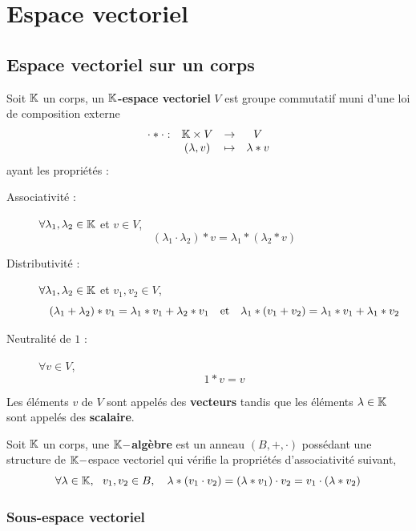 \chapter{Espace vectoriel}
\section{Espace vectoriel sur un corps}


\begin{definition} \label{def: Espace vectoriel}
Soit $\K$ un corps, un $\K$\textbf{-espace vectoriel} $V$ est groupe commutatif muni d'une loi de composition externe
	\[
	\begin{array}{cccc}
		\cdot * \cdot : & \mathbb{K} \times V & \to & V \\
						& (\lambda, v) & \mapsto & \lambda * v
	\end{array}
	\]
ayant les propriétés :
\begin{description}
	\item[Associativité :] $\forall \lambda_1, \lambda_2 \in \mathbb{K}$ et $v \in V$,
	\[
	(\lambda_1 \cdot \lambda_2) * v = \lambda_1 * (\lambda_2 * v)
	\]
	\item[Distributivité :] $\forall \lambda_1, \lambda_2 \in \mathbb{K}$ et $v_1, v_2 \in V$,
	\[
	(\lambda_1 + \lambda_2) * v_1 = \lambda_1 * v_1 + \lambda_2 * v_1 \quad \text{et} \quad \lambda_1 * (v_1 + v_2) = \lambda_1 * v_1 + \lambda_1 * v_2
	\]
	\item[Neutralité de $1$ :] $\forall v \in V$,
	\[
	1 * v = v	
	\]
\end{description}
Les éléments $v$ de $V$ sont appelés des \textbf{vecteurs} tandis que les éléments $\lambda \in \mathbb{K}$ sont appelés des \textbf{scalaire}.
\end{definition}


\begin{definition}[$\K$-algèbre] \label{def: algèbre}
Soit $\K$ un corps, une $\mathbb{K}-$\textbf{algèbre} est un anneau $(B, +, \cdot)$ possédant une structure de $\mathbb{K}-$espace vectoriel qui vérifie la propriétés d'associativité suivant,
	\[
	\forall \lambda \in \mathbb{K}, ~\ v_1, v_2 \in B, \quad \lambda * (v_1 \cdot v_2) = (\lambda * v_1) \cdot v_2 =  v_1 \cdot (\lambda * v_2)
	\]
\end{definition}


\subsection{Sous-espace vectoriel}

